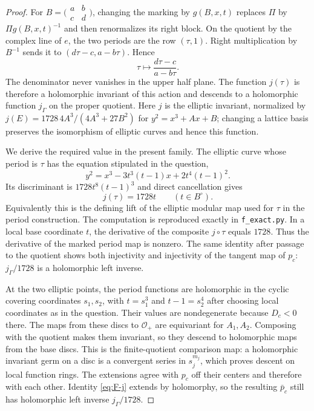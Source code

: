 \begin{proof}
For $B=\bigl(\begin{smallmatrix}a&b\\c&d\end{smallmatrix}\bigr)$, changing
the marking by $g(B,x,t)$ replaces $\Pi$ by $\Pi g(B,x,t)^{-1}$ and then
renormalizes its right block.  On the quotient by the complex line of
$e$, the two periods are the row $(\tau,1)$.  Right multiplication by
$B^{-1}$ sends it to $(d\tau-c,a-b\tau)$.  Hence
\begin{equation}\label{eq:F-tauaction}
 \tau\longmapsto\frac{d\tau-c}{a-b\tau}.
\end{equation}
The denominator never vanishes in the upper half plane.  The function
$j(\tau)$ is therefore a holomorphic invariant of this action and
descends to a holomorphic function $j_\Gamma$ on the proper quotient.
Here $j$ is the elliptic invariant, normalized by
$j(E)=1728\,4A^3/(4A^3+27B^2)$ for $y^2=x^3+Ax+B$; changing a lattice
basis preserves the isomorphism of elliptic curves and hence this
function.

We derive the required value in the present family.  The elliptic curve
whose period is $\tau$ has the equation stipulated in the question,
\[
 y^2=x^3-3t^3(t-1)x+2t^4(t-1)^2.
\]
Its discriminant is $1728t^8(t-1)^3$ and direct cancellation gives
\begin{equation}\label{eq:F-j}
 j(\tau)=1728t\qquad(t\in B^\circ).
\end{equation}
Equivalently this is the defining lift of the elliptic modular map used
for $\tau$ in the period construction.  The computation is reproduced
exactly in \texttt{f\_exact.py}.  In a local base coordinate $t$, the
derivative of the composite $j\circ\tau$ equals $1728$.  Thus the
derivative of the marked period map is nonzero.  The same identity after
passage to the quotient shows both injectivity and injectivity of the
tangent map of $p_c$: $j_\Gamma/1728$ is a holomorphic left inverse.

At the two elliptic points, the period functions are holomorphic in the
cyclic covering coordinates $s_1,s_2$, with $t=s_1^3$ and
$t-1=s_2^4$ after choosing local coordinates as in the question.  Their
values are nondegenerate because $D_c<0$ there.  The maps from these
discs to $\mathcal O_+$ are equivariant for $A_1,A_2$.  Composing with
the quotient makes them invariant, so they descend to holomorphic maps
from the base discs.  This is the finite-quotient comparison map: a
holomorphic invariant germ on a disc is a convergent series in $s_j^{m_j}$,
which proves descent on local function rings.  The extensions agree
with $p_c$ off their centers and therefore with each other.  Identity
\eqref{eq:F-j} extends by holomorphy, so the resulting $\bar p_c$ still
has holomorphic left inverse $j_\Gamma/1728$.


\end{proof}
